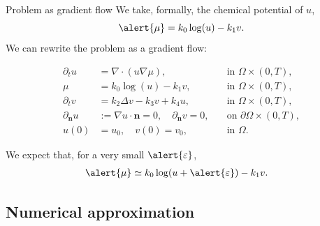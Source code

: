\begin{frame}{Problem as gradient flow}
  We take, formally, the chemical potential of $u$, $$\alert{\mu}=k_0\log(u) - k_1 v.$$
  We can rewrite the problem as a gradient flow:
  \begin{block}{}
      \vspace*{-0.5cm}
      \begin{subequations}
          \begin{align*}
          \partial_t u&=\nabla\cdot\left(u\nabla\mu\right),\quad&\text{in }\Omega\times (0,T),\\
          \mu &= k_0\log(u)-k_1v,\quad&\text{in }\Omega\times (0,T),\\
          \partial_t v&=k_2\Delta v-k_3v+k_4u,\quad&\text{in }\Omega\times (0,T),\\
          \partial_\mathbf{n}u& :=\nabla u\cdot \mathbf{n}=0,\quad
          \partial_\mathbf{n} v 
          =0, \quad &\text{on }\partial\Omega\times (0,T),\\
          u(0)&=u_0,\quad v(0)=v_0%
          ,\quad&\text{in }\Omega.%
          \end{align*}
      \end{subequations}
      \end{block}

  We expect that, for a very small $\alert{\varepsilon}$,
  \begin{align*}
      \alert{\mu}&\simeq k_0\log(u+\alert{\varepsilon}) - k_1 v.
  \end{align*}
\end{frame}

\subsection{Numerical approximation}


